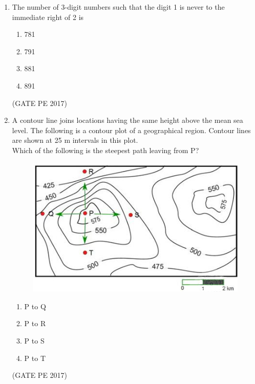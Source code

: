 \documentclass[journal,12pt,onecolumn]{IEEEtran}
\theoremstyle{remark}
\begin{document}
\begin{enumerate}[start=1, label={Q\arabic*.}]
\item The number of 3-digit numbers such that the digit 1 is never to the immediate right of 2 is
\begin{enumerate}[label=(\Alph*)]
\item 781
\item 791
\item 881
\item 891
\end{enumerate}
\hfill{(GATE PE 2017)}

\item A contour line joins locations having the same height above the mean sea level. The following is a contour plot of a geographical region. Contour lines are shown at 25 m intervals in this plot.\\
Which of the following is the steepest path leaving from P?
\begin{figure}[h]
    \centering
    \includegraphics[width=0.7\coulumnwidth]{Figs/Graph_Q65.png}
\end{figure}
\begin{enumerate}
    \item P to Q
    \item P to R
    \item P to S
    \item P to T
\end{enumerate}
\hfill{(GATE PE 2017)}

\end{enumerate}

\newpage


\end{document}
